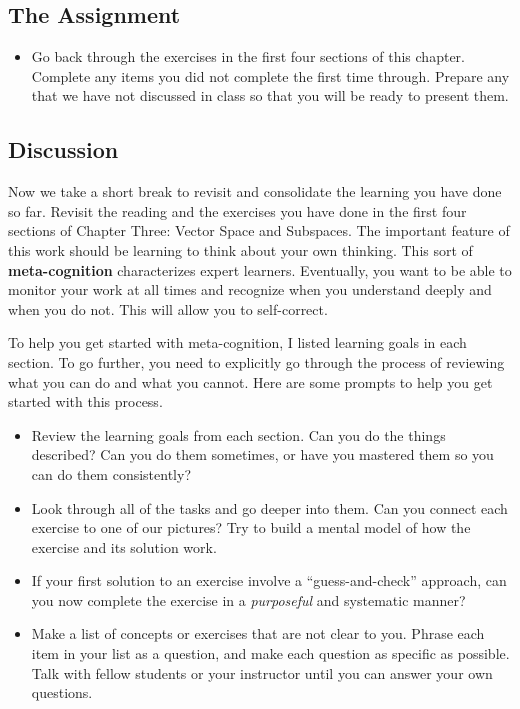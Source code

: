 \documentclass[10pt,]{book}
\newcommand{\terminology}[1]{\textbf{#1}}
\theoremstyle{plain}
\numberwithin{equation}{section}
\begin{document}
\subsection[The Assignment]{The Assignment}\label{subsection-78}
\begin{itemize}
\item{}
        Go back through the exercises in the first four sections of this chapter.
        Complete any items you
        did not complete the first time through. Prepare any that we have not
        discussed in class so that you will be ready to present them.
      \end{itemize}
\typeout{************************************************}
\typeout{************************************************}
\subsection[Discussion]{Discussion}\label{subsection-79}
Now we take a short break to revisit and consolidate the learning you
      have done so far. Revisit the reading and the exercises you have done in
      the first four sections of Chapter Three: Vector Space and Subspaces. The
      important feature of this work should be
      learning to think about your own thinking. This sort of \terminology{meta-cognition}
      characterizes expert learners. Eventually, you want to be able to monitor
      your work at all times and recognize when you understand deeply and when
      you do not. This will allow you to self-correct.
\par
To help you get started with meta-cognition, I listed learning goals in
      each section. To go further, you need to explicitly go through the process
      of reviewing what you can do and what you cannot. Here are some prompts to
      help you get started with this process.
      \begin{itemize}
\item{}
          Review the learning goals from each section. Can you do the things
          described? Can you do them sometimes, or have you mastered them so you
          can do them consistently?
        \item{}
          Look through all of the tasks and go deeper into them. Can you
          connect each exercise to one of our pictures? Try to build a mental
          model of how the exercise and its solution work.
        \item{}
          If your first solution to an exercise involve a ``guess-and-check''
          approach, can you now complete the exercise in a \emph{purposeful}
          and systematic manner?
        \item{}
          Make a list of concepts or exercises that are not clear to you. Phrase
          each item in your list as a question, and make each question as
          specific as possible. Talk with fellow students or your
          instructor until you can answer your own questions.
        \end{itemize}
\end{document}
